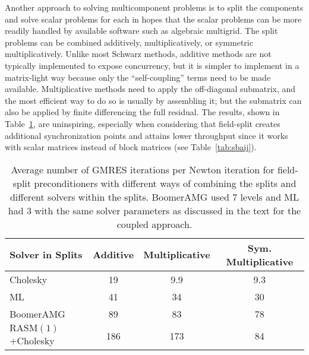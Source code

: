 \documentclass[draft,lineno,jgrga]{AGUTeX}
\newcommand{\RASM}{\mathrm{RASM}}
\begin{document}
\begin{article}
Another approach to solving multicomponent problems is to split the components and solve scalar problems for each in hopes that the scalar problems can be more readily handled by available software such as algebraic multigrid.  The split problems can be combined additively, multiplicatively, or symmetric multiplicatively.  Unlike most Schwarz methods, additive methods are not typically implemented to expose concurrency, but it is simpler to implement in a matrix-light way because only the ``self-coupling'' terms need to be made available.  Multiplicative methods need to apply the off-diagonal submatrix, and the most efficient way to do so is usually by assembling it; but the submatrix can also be applied by finite differencing the full residual.  The results, shown in Table~\ref{tab:fieldsplit}, are uninspiring, especially when considering that field-split creates additional synchronization points and attains lower throughput since it works with scalar matrices instead of block matrices (see Table~\ref{tab:sbaij}).

\begin{table}
  \centering\caption{Average number of GMRES iterations per Newton iteration for field-split preconditioners with different ways of combining the splits and different solvers within the splits.
BoomerAMG used 7 levels and ML had 3 with the same solver parameters as discussed in the text for the coupled approach.}\label{tab:fieldsplit}
  \begin{tabular}{l|ccc}
    Solver in Splits    & Additive & Multiplicative & Sym. Multiplicative \\ \hline
    Cholesky            & 19       & 9.9            & 9.3                 \\
    ML                  & 41       & 34             & 30                  \\
    BoomerAMG           & 89       & 83             & 78                  \\
    $\RASM(1)$+Cholesky & 186      & 173            & 84
  \end{tabular}
\end{table}


\end{article}
\end{document}
